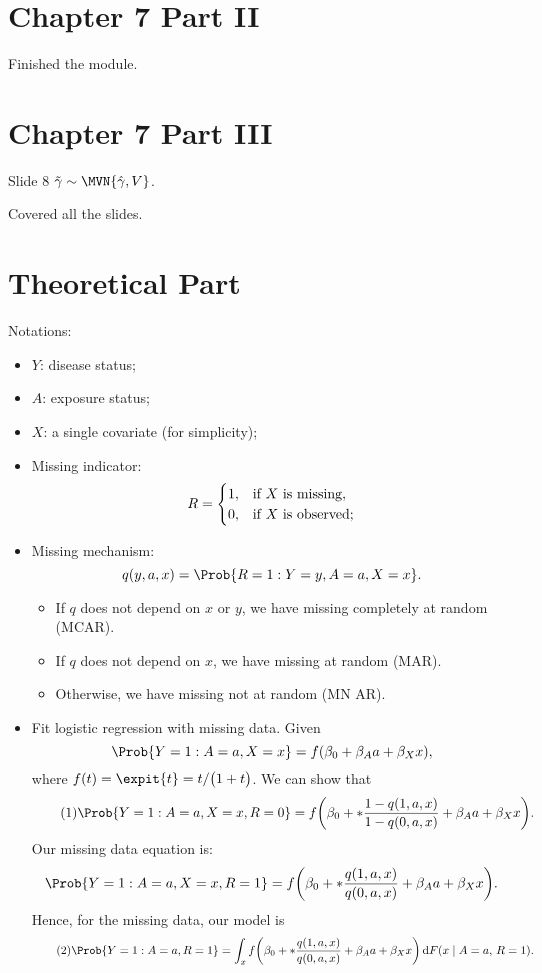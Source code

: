 \section*{Chapter 7 Part II}
Finished the module.
\section*{Chapter 7 Part III}
\begin{Regular}{Slide 8}
      $ \tilde{\gamma}\sim \MVN{\hat{\gamma},V} $.
\end{Regular}
Covered all the slides.
\section*{Theoretical Part}
Notations:
\begin{itemize}
      \item $ Y $: disease status;
      \item $ A $: exposure status;
      \item $ X $: a single covariate (for simplicity);
      \item Missing indicator:
            \[ R=\begin{cases}
                        1, & \text{if $ X $ is missing},  \\
                        0, & \text{if $ X $ is observed};
                  \end{cases} \]
      \item Missing mechanism:
            \[ q(y,a,x)=\Prob{R=1\given Y=y,A=a,X=x}. \]
            \begin{itemize}
                  \item If $ q $ does not depend on $ x $ or $ y $, we have missing completely at random (MCAR).
                  \item If $ q $ does not depend on $ x $, we have missing at random (MAR).
                  \item Otherwise, we have missing not at random (MN AR).
            \end{itemize}
      \item Fit logistic regression with missing data. Given
            \[ \Prob{Y=1\given A=a,X=x}=f(\beta_0+\beta_A a+\beta_X x), \]
            where $ f(t)=\expit{t}=\exp{t}/\bigl(1+\exp{t}\bigr) $.
            We can show that
            \begin{equation}\label{M1}\tag*{(1)}
                  \Prob{Y=1\given A=a,X=x,R=0}=f\biggl(\beta_0+\log*{\frac{1-q(1,a,x)}{1-q(0,a,x)}}+\beta_A a+\beta_X x\biggr).
            \end{equation}
            Our missing data equation is:
            \[ \Prob{Y=1\given A=a,X=x,R=1}=f\biggl(\beta_0+\log*{\frac{q(1,a,x)}{q(0,a,x)}}+\beta_A a+\beta_X x\biggr). \]
            Hence, for the missing data, our model is
            \begin{equation}\label{M2}\tag*{(2)}
                  \Prob{Y=1\given A=a,R=1}=\int_{x}f\biggl(\beta_0+\log*{\frac{q(1,a,x)}{q(0,a,x)}}+\beta_A a+\beta_X x\biggr)\odif{F(x\mid A=a\text{$,$ }R=1)}.
            \end{equation}
\end{itemize}
